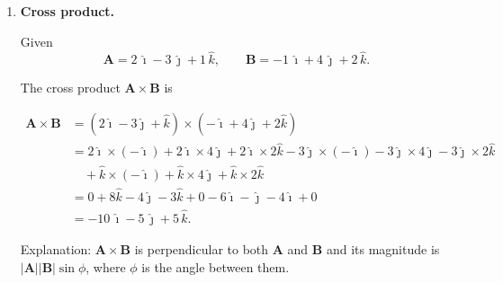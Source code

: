\documentclass[12pt]{article}
\begin{document}
\begin{enumerate}
\begin{enumerate}
    Compute the dot product:
    \[
      \mathbf{v}(1)\cdot \mathbf{a}(1)
      = (2a)(2a) + (3b)(6b)
      = 4a^2 + 18 b^2.
    \]

    Compute magnitudes:
    \[
      \|\mathbf{v}(1)\| = \sqrt{(2a)^2 + (3b)^2}
      = \sqrt{4a^2 + 9b^2},
    \]
    \[
      \|\mathbf{a}(1)\| = \sqrt{(2a)^2 + (6b)^2}
      = \sqrt{4a^2 + 36b^2}.
    \]

    Therefore
    \[
      \cos\theta
      = \frac{4a^2 + 18b^2}{\sqrt{4a^2 + 9b^2}\,\sqrt{4a^2 + 36b^2}}.
    \]

    So the angle $\theta$ is
    \[
      \theta = \arccos\!\left(
        \frac{4a^2 + 18b^2}{\sqrt{4a^2 + 9b^2}\,\sqrt{4a^2 + 36b^2}}
      \right).
    \]

    Interpretation: the angle depends on $a$ and $b$; if $\mathbf{a}$ is parallel to $\mathbf{v}$, then the direction of motion is speeding up with no change in direction. If not parallel, part of $\mathbf{a}$ turns the velocity.
\end{enumerate}


\item \textbf{Cross product.}

Given
\[
\mathbf{A} = 2\,\hat{\imath} - 3\,\hat{\jmath} + 1\,\hat{k},
\qquad
\mathbf{B} = -1\,\hat{\imath} + 4\,\hat{\jmath} + 2\,\hat{k}.
\]


The cross product $\mathbf{A}\times\mathbf{B}$ is


\[
\begin{aligned}
\mathbf{A}\times\mathbf{B}
&= (2\hat{\imath}-3\hat{\jmath}+\hat{k})\times(-\hat{\imath}+4\hat{\jmath}+2\hat{k}) \\
&= 2\hat{\imath}\times(-\hat{\imath}) + 2\hat{\imath}\times 4\hat{\jmath} + 2\hat{\imath}\times 2\hat{k}
  -3\hat{\jmath}\times(-\hat{\imath}) -3\hat{\jmath}\times 4\hat{\jmath} -3\hat{\jmath}\times 2\hat{k} \\
&\quad + \hat{k}\times(-\hat{\imath}) + \hat{k}\times 4\hat{\jmath} + \hat{k}\times 2\hat{k} \\
&= 0 + 8\hat{k} - 4\hat{\jmath} - 3\hat{k} + 0 - 6\hat{\imath} - \hat{\jmath} - 4\hat{\imath} + 0 \\
&= -10\,\hat{\imath} - 5\,\hat{\jmath} + 5\,\hat{k}.
\end{aligned}
\]

Explanation: $\mathbf{A}\times\mathbf{B}$ is perpendicular to both $\mathbf{A}$ and $\mathbf{B}$ and its magnitude is $|\mathbf{A}||\mathbf{B}|\sin\phi$, where $\phi$ is the angle between them.
\end{enumerate}
\end{document}
